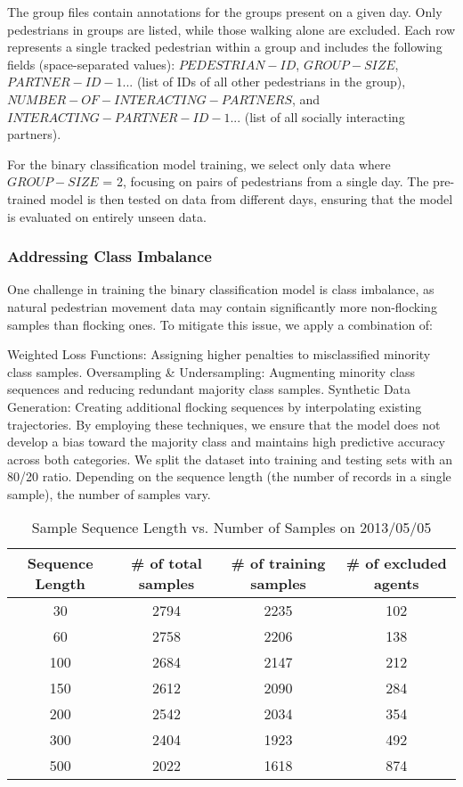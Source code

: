 \documentclass{article}
\begin{document}
The group files contain annotations for the groups present on a given day. Only pedestrians in groups are listed, while those walking alone are excluded. Each row represents a single tracked pedestrian within a group and includes the following fields (space-separated values): $PEDESTRIAN-ID$, \textit{$GROUP-SIZE$}, \textit{$PARTNER-ID-1$}... (list of IDs of all other pedestrians in the group), \textit{$NUMBER-OF-INTERACTING-PARTNERS$}, and \textit{$INTERACTING-PARTNER-ID-1$}... (list of all socially interacting partners).

For the binary classification model training, we select only data where \textit{$GROUP-SIZE$} = 2, focusing on pairs of pedestrians from a single day. The pre-trained model is then tested on data from different days, ensuring that the model is evaluated on entirely unseen data.

\subsubsection*{Addressing Class Imbalance}

One challenge in training the binary classification model is class imbalance, as natural pedestrian movement data may contain significantly more non-flocking samples than flocking ones. To mitigate this issue, we apply a combination of:

Weighted Loss Functions: Assigning higher penalties to misclassified minority class samples.
Oversampling \& Undersampling: Augmenting minority class sequences and reducing redundant majority class samples.
Synthetic Data Generation: Creating additional flocking sequences by interpolating existing trajectories.
By employing these techniques, we ensure that the model does not develop a bias toward the majority class and maintains high predictive accuracy across both categories.
We split the dataset into training and testing sets with an 80/20 ratio. Depending on the sequence length (the number of records in a single sample), the number of samples vary.


\begin{table}[H]
   
    \label{tab:data_summary}
    \centering
    
    \begin{tabular}{@{}cccc@{}} 
     \toprule
     \textbf{Sequence Length} & \textbf{\# of total samples} & 
     \textbf{\# of training samples} & \textbf{\# of excluded agents} \\
     \midrule
    30 & 2794 & 2235  & 102 \\
    60 & 2758 &  2206 &  138\\
    100 & 2684 & 2147 &  212\\
    150 & 2612 & 2090 &  284\\
    200 & 2542 & 2034 & 354\\
    300 & 2404 & 1923 & 492\\
    500 & 2022 & 1618 &  874\\
     \bottomrule
    \end{tabular}  
    \caption{Sample Sequence Length vs. Number of Samples on 2013/05/05}
    \label{tab:seq_vs_sample}
\end{table}
\end{document}

